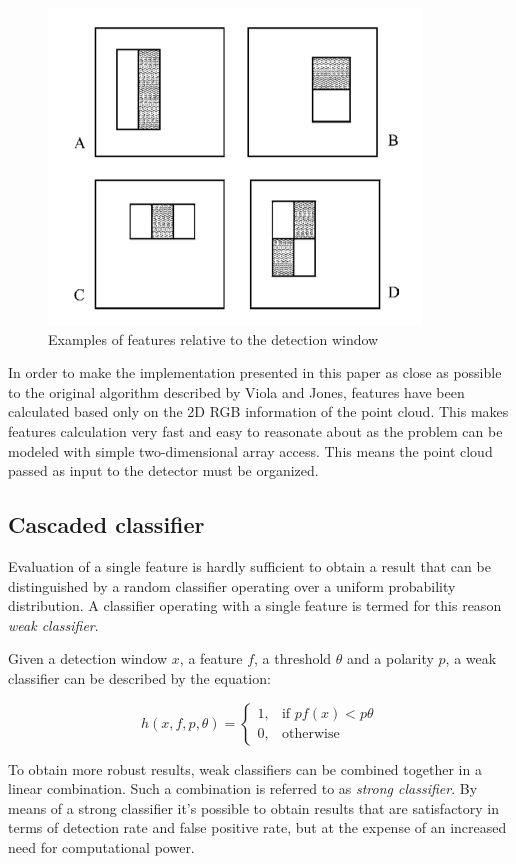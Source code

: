\documentclass[a4paper,11pt,titlepage]{article}
\begin{document}
\begin{figure}[h]
  \centering
  \includegraphics[scale=0.5]{features.jpg}
  \caption{Examples of features relative to the detection window}
  \label{fig:features}
\end{figure}

In order to make the implementation presented in this paper as close as possible
to the original algorithm described by Viola and Jones, features have been
calculated based only on the 2D RGB information of the point cloud. This makes
features calculation very fast and easy to reasonate about as the problem can be
modeled with simple two-dimensional array access. This means the point cloud
passed as input to the detector must be organized.

\subsection{Cascaded classifier}
Evaluation of a single feature is hardly sufficient to obtain a result that can
be distinguished by a random classifier operating over a uniform probability
distribution. A classifier operating with a single feature is termed for this
reason \emph{weak classifier}.

Given a detection window $x$, a feature $f$, a threshold $\theta$ and a polarity
$p$, a weak classifier can be described by the equation:

\[ 
  h(x,f,p,\theta) = 
\begin{cases}
  1,& \text{if } pf(x) < p\theta \\ 0,& \text{otherwise}
\end{cases}
\]

To obtain more robust results, weak classifiers can be combined together in a
linear combination. Such a combination is referred to as \emph{strong
classifier}. By means of a strong classifier it's possible to obtain
results that are satisfactory in terms of detection rate and false positive
rate, but at the expense of an increased need for computational power.
\end{document}
